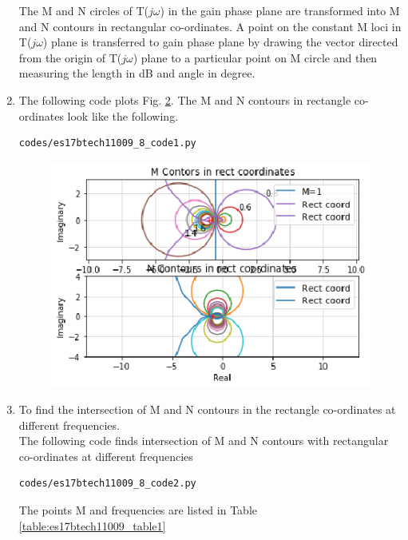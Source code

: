 \begin{enumerate}[label=\thesection.\arabic*.,ref=\thesection.\theenumi]
\begin{figure}[!h]
\caption{}
\label{fig:es17btech11009_8}
\end{figure}
The M and N circles of T($j\omega$) in the gain phase plane are transformed into M and N contours in rectangular co-ordinates. A point on the constant M loci in T($j\omega$) plane is transferred to gain phase plane by drawing the vector directed from the origin of T($j\omega$) plane to a particular point on M circle and then measuring the length in dB and angle in degree.
\item
The following code plots Fig. \ref{fig:es17btech11009_8_1}.
The M and N contours in rectangle co-ordinates look like the following.
\begin{lstlisting}
codes/es17btech11009_8_code1.py
\end{lstlisting}

\begin{figure}[!h]
\includegraphics[width=\columnwidth]{./figs/es17btech11009_8_fig1.eps}
\caption{}
\label{fig:es17btech11009_8_1}
\end{figure}
\item
To find the intersection of M and N contours in the rectangle co-ordinates at different frequencies. \\
\solution 
The following code finds intersection of M and N contours with rectangular co-ordinates at different frequencies
\begin{lstlisting}
codes/es17btech11009_8_code2.py
\end{lstlisting}
The points M and frequencies are listed in Table  \ref{table:es17btech11009_table1}
\begin{table}[!ht]
\centering

\caption{}

\end{table}
\end{enumerate}
